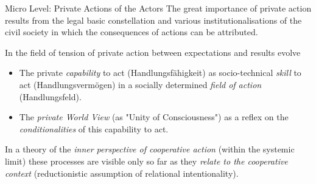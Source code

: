 \documentclass{beamer}
\begin{document}
\begin{frame}{Micro Level: Private Actions of the Actors}
The great importance of private action results from the legal basic
constellation and various institutionalisations of the civil society in which
the consequences of actions can be attributed.

In the field of tension of private action between expectations and results
evolve\vspace{-1em}
\begin{itemize}
\item The private \emph{capability} to act (Handlungsfähigkeit) as
  socio-technical \emph{skill} to act (Handlungsvermögen) in a socially
  determined \emph{field of action} (Handlungsfeld).
\item The \emph{private World View} (as "Unity of Consciousness") as a reflex
  on the \emph{conditionalities} of this capability to act.
\end{itemize}\vspace{-1em}
In a theory of the \emph{inner perspective of cooperative action} (within the
systemic limit) these processes are visible only so far as they \emph{relate
  to the cooperative context} (reductionistic assumption of relational
intentionality).
\end{frame}
\end{document}
